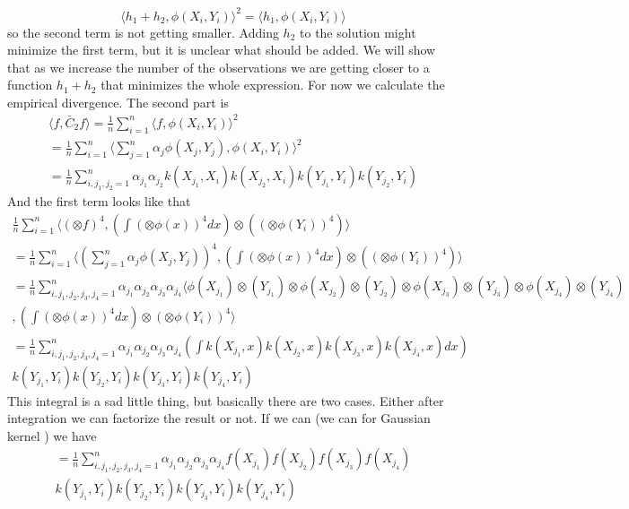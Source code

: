 \documentclass[10pt]{article}
\begin{document}
\begin{equation}
 \langle h_1 + h_2 , \phi(X_i,Y_i) \rangle^2 =\langle h_1 , \phi(X_i,Y_i) \rangle
\end{equation}
so the second term is not getting smaller. Adding $h_2$ to the solution might minimize the first term, but it is unclear what should be added. We will show that as we increase the number of the observations we are getting closer to a function $h_1 + h_2$ that minimizes the whole expression.
For now we calculate the empirical divergence. The second part is
\begin{align}
  \langle f, \bar C_2 f \rangle = \frac 1 n \sum_{i=1}^n \langle f , \phi(X_i,Y_i) \rangle^2 \\
  = \frac 1 n \sum_{i=1}^n \langle \sum_{j=1}^{n} \alpha_j \phi(X_j,Y_j) , \phi(X_i,Y_i) \rangle^2 \\
   = \frac 1 n \sum_{i,j_1,j_2=1}^n \alpha_{j_1} \alpha_{j_2} k(X_{j_1},X_i) k(X_{j_2},X_i)  k(Y_{j_1},Y_i) k(Y_{j_2},Y_i) 
\end{align}
And the first term looks like that 
\begin{align}
  \frac 1 n \sum_{i=1}^n \langle  (\otimes f)^4  ,  \left( \int  (\otimes \phi(x))^4 dx  \right)  \otimes \left(    (\otimes \phi(Y_{i}))^4 \right) \rangle \\
  = \frac 1 n \sum_{i=1}^n \langle  ( \sum_{j=1}^{n} \alpha_j \phi(X_j,Y_j))^4  ,  \left( \int  (\otimes \phi(x))^4 dx  \right)  \otimes \left(    (\otimes \phi(Y_{i}))^4 \right) \rangle \\
  =\frac 1 n \sum_{i,j_1,j_2,j_3,j_4=1}^n  \alpha_{j_1} \alpha_{j_2} \alpha_{j_3} \alpha_{j_4} \langle \phi(X_{j_1}) \otimes (Y_{j_1}) \otimes  \phi(X_{j_2}) \otimes (Y_{j_2}) \otimes  \phi(X_{j_3}) \otimes (Y_{j_3}) \otimes  \phi(X_{j_4}) \otimes (Y_{j_4})\\
  ,\left( \int  (\otimes \phi(x))^4 dx  \right)  \otimes \left(    \otimes \phi(Y_{i}) \right)^4 \rangle \\
  =\frac 1 n \sum_{i,j_1,j_2,j_3,j_4=1}^n  \alpha_{j_1} \alpha_{j_2} \alpha_{j_3} \alpha_{j_4} \left( \int k(X_{j_1},x) k(X_{j_2},x) k(X_{j_3},x) k(X_{j_4},x)  dx \right) \\ 
    k(Y_{j_1},Y_i) k(Y_{j_2},Y_i)k(Y_{j_3},Y_i)k(Y_{j_4},Y_i)
\end{align}
This integral is a sad little thing, but basically there are two cases. Either after integration we can factorize the result or not. If we can (we can for Gaussian kernel ) we have  
\begin{align}
 =\frac 1 n \sum_{i,j_1,j_2,j_3,j_4=1}^n  \alpha_{j_1} \alpha_{j_2} \alpha_{j_3} \alpha_{j_4}  f(X_{j_1}) f(X_{j_2}) f(X_{j_3}) f(X_{j_4})   \\ 
    k(Y_{j_1},Y_i) k(Y_{j_2},Y_i)k(Y_{j_3},Y_i)k(Y_{j_4},Y_i)
\end{align}
\end{document}
